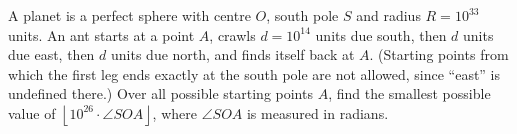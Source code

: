 A planet is a perfect sphere with centre $O$, south pole $S$ and radius $R=10^{33}$ units. An ant starts at a point $A$, crawls $d=10^{14}$ units due south, then $d$ units due east, then $d$ units due north, and finds itself back at $A$. (Starting points from which the first leg ends exactly at the south pole are not allowed, since ``east'' is undefined there.) Over all possible starting points $A$, find the smallest possible value of $\left\lfloor10^{26}\cdot\angle SOA\right\rfloor$, where $\angle SOA$ is measured in radians.
